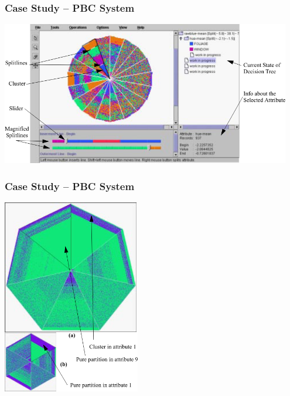 \documentclass[xcolor=svgnames]{beamer}
\begin{document}
\begin{frame}
	\frametitle{Case Study -- PBC System}
	\begin{center}
		\includegraphics[width=0.95\textwidth]{2013-IA080-interactive-machine-learning/pbc-screenshot.png}
	\end{center}
\end{frame}
\begin{frame}
	\frametitle{Case Study -- PBC System}
	\begin{center}
		\includegraphics[width=0.45\textwidth]{2013-IA080-interactive-machine-learning/pbc-example.png}
	\end{center}
\end{frame}
\end{document}
